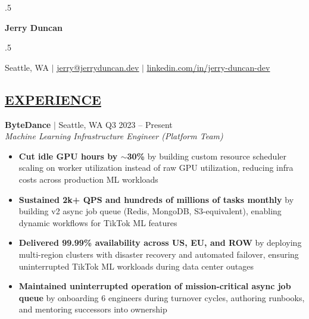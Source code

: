 \documentclass[overlapped,line,11pt]{res}
\begin{document}
\moveleft.5\hoffset\centerline{\huge\bf Jerry Duncan}
\vspace{.2em}
\moveleft.5\hoffset\centerline{Seattle, WA $|$ \href{mailto:jerry@jerryduncan.dev}{\uline{jerry@jerryduncan.dev}} $|$ \href{https://www.linkedin.com/in/jerry-duncan-dev}{\uline{linkedin.com/in/jerry-duncan-dev}}}
\vspace{0.5em}

\begin{resume}

\section{\underline{EXPERIENCE}}
\vspace{4pt}

\textbf{ByteDance} $|$ Seattle, WA \hfill Q3 2023 -- Present\\
{\sl Machine Learning Infrastructure Engineer (Platform Team)}
\vspace{4pt}
\begin{itemize} \itemsep 2pt
  \item \textbf{Cut idle GPU hours by $\sim$30\%} by building custom resource scheduler scaling on worker utilization instead of raw GPU utilization, reducing infra costs across production ML workloads
  \item \textbf{Sustained 2k+ QPS and hundreds of millions of tasks monthly} by building v2 async job queue (Redis, MongoDB, S3-equivalent), enabling dynamic workflows for TikTok ML features

  \item \textbf{Delivered 99.99\% availability across US, EU, and ROW} by deploying multi-region clusters with disaster recovery and automated failover, ensuring uninterrupted TikTok ML workloads during data center outages
  \item \textbf{Maintained uninterrupted operation of mission-critical async job queue} by onboarding 6 engineers during turnover cycles, authoring runbooks, and mentoring successors into ownership
\end{itemize}



\end{resume}
\end{document}
